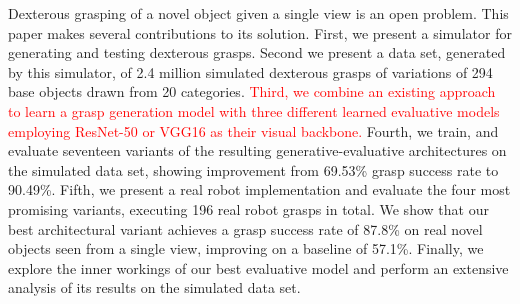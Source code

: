 Dexterous grasping of a novel object given a single view is an open problem. This paper makes several contributions to its solution. First, we present a simulator for generating and testing dexterous grasps. Second we present a data set, generated by  this simulator, of 2.4 million simulated dexterous grasps of variations of 294 base objects drawn from 20 categories. \textcolor{red}{Third, we combine an existing approach to learn a grasp generation model with three different learned evaluative models employing ResNet-50 or VGG16 as their visual backbone.} Fourth, we train, and evaluate seventeen variants of the resulting generative-evaluative architectures on the simulated data set, showing improvement from 69.53\% grasp success rate to 90.49\%. Fifth, we present a real robot implementation and evaluate the four most promising variants, executing 196 real robot grasps in total. We show that our best architectural variant achieves a grasp success rate of 87.8\% on real novel objects seen from a single view, improving on a baseline of 57.1\%. Finally, we explore the inner workings of our best evaluative model and perform an extensive analysis of its results on the simulated data set. 



